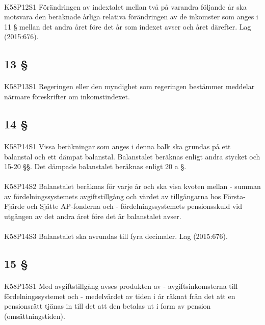 \documentclass[a4paper,notitlepage,openany,10pt]{book}
\begin{document}
\paragraph*{}
{\tiny K58P12S1}
Förändringen av indextalet mellan två på varandra följande år ska motsvara den beräknade årliga relativa förändringen av de inkomster som anges i 11 § mellan det andra året före det år som indexet avser och året därefter.
Lag (2015:676).
\subsection*{13 §}
\paragraph*{}
{\tiny K58P13S1}
Regeringen eller den myndighet som regeringen bestämmer meddelar närmare föreskrifter om inkomstindexet.
\subsection*{14 §}
\paragraph*{}
{\tiny K58P14S1}
Vissa beräkningar som anges i denna balk ska grundas på ett balanstal och ett dämpat balanstal. Balanstalet beräknas enligt andra stycket och 15-20 §§. Det dämpade balanstalet beräknas enligt 20 a §.
\paragraph*{}
{\tiny K58P14S2}
Balanstalet beräknas för varje år och ska visa kvoten mellan
\newline - summan av fördelningssystemets avgiftstillgång och värdet av tillgångarna hos Första-Fjärde och Sjätte AP-fonderna och
\newline - fördelningssystemets pensionsskuld vid utgången av det andra året före det år balanstalet avser.
\paragraph*{}
{\tiny K58P14S3}
Balanstalet ska avrundas till fyra decimaler.
Lag (2015:676).
\subsection*{15 §}
\paragraph*{}
{\tiny K58P15S1}
Med avgiftstillgång avses produkten av
\newline - avgiftsinkomsterna till fördelningssystemet och
\newline - medelvärdet av tiden i år räknat från det att en pensionsrätt tjänas in till det att den betalas ut i form av pension (omsättningstiden).
\end{document}
